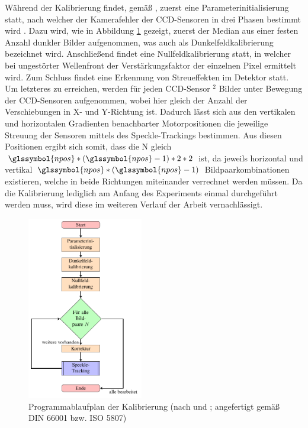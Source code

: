 Während der Kalibrierung findet, gemäß \citeauthor{Ber13}, zuerst eine Parameterinitialisierung statt, nach welcher der Kamerafehler der \gls{CCD}-Sensoren in drei Phasen bestimmt wird . Dazu wird, wie in Abbildung \ref{fig:graph_kalibrierung} gezeigt, zuerst der Median aus einer festen Anzahl dunkler Bilder aufgenommen, was auch als Dunkelfeldkalibrierung bezeichnet wird. Anschließend findet eine Nullfeldkalibrierung statt, in welcher bei ungestörter Wellenfront der Verstärkungsfaktor der einzelnen Pixel ermittelt wird. Zum Schluss findet eine Erkennung von Streueffekten im Detektor statt. Um letzteres zu erreichen, werden für jeden \gls{CCD}-Sensor $^2$ Bilder unter Bewegung der \gls{CCD}-Sensoren aufgenommen, wobei  hier gleich der Anzahl der Verschiebungen in X- und Y-Richtung ist. Dadurch lässt sich aus den vertikalen und horizontalen Gradienten benachbarter Motorpositionen die jeweilige Streuung der Sensoren mittels des Speckle-Trackings bestimmen. Aus diesen  Positionen ergibt sich somit, dass die \gls{N} gleich $\glssymbol{npos}*\left(\glssymbol{npos} - 1\right) * 2 * 2$ ist, da jeweils horizontal und vertikal $\glssymbol{npos}*\left(\glssymbol{npos} - 1\right)$ Bildpaarkombinationen existieren, welche in beide Richtungen miteinander verrechnet werden müssen. Da die Kalibrierung lediglich am Anfang des Experiments einmal durchgeführt werden muss, wird diese im weiteren Verlauf der Arbeit vernachlässigt. 

\begin{figure}[htbp]
	\centering
	\includegraphics[width=0.45\textwidth]{pdf/graph_init}
	\caption[Kalibrierung]{Programmablaufplan der Kalibrierung (nach  und \cite{Coj17}; angefertigt gemäß DIN 66001 bzw. ISO 5807)}
	\label{fig:graph_kalibrierung}
\end{figure}

